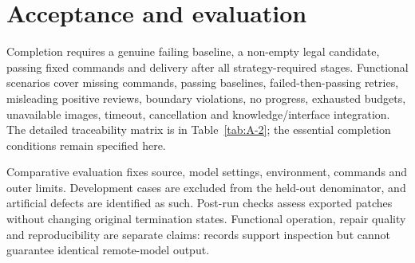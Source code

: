 \section{Acceptance and evaluation}\label{sec:3.4}

Completion requires a genuine failing baseline, a non-empty legal candidate, passing fixed commands and delivery after all strategy-required stages. Functional scenarios cover missing commands, passing baselines, failed-then-passing retries, misleading positive reviews, boundary violations, no progress, exhausted budgets, unavailable images, timeout, cancellation and knowledge/interface integration. The detailed traceability matrix is in Table~\ref{tab:A-2}; the essential completion conditions remain specified here.

Comparative evaluation fixes source, model settings, environment, commands and outer limits. Development cases are excluded from the held-out denominator, and artificial defects are identified as such. Post-run checks assess exported patches without changing original termination states. Functional operation, repair quality and reproducibility are separate claims: records support inspection but cannot guarantee identical remote-model output.
